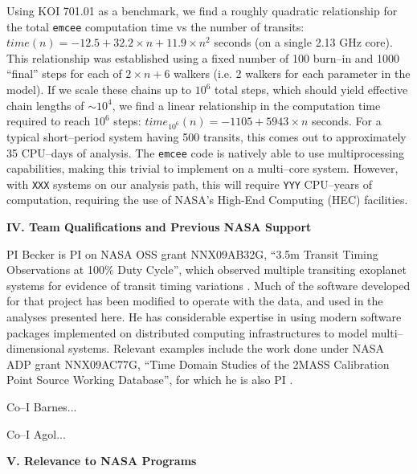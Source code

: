 Using KOI 701.01 as a benchmark, we find a roughly quadratic
relationship for the total {\tt emcee} computation time vs the number
of transits: $time(n) = -12.5 + 32.2 \times n + 11.9 \times n^2$
seconds (on a single 2.13 GHz core).  This relationship was
established using a fixed number of 100 burn--in and 1000 ``final''
steps for each of $2 \times n + 6$ walkers (i.e. 2 walkers for each
parameter in the model).  If we scale these chains up to $10^6$ total
steps, which should yield effective chain lengths of $\sim 10^4$, we
find a linear relationship in the computation time required to reach
$10^6$ steps: $time_{10^6}(n) = -1105 + 5943 \times n$ seconds.  For a
typical short--period system having 500 transits, this comes out to
approximately 35 CPU--days of analysis.  The {\tt emcee} code is
natively able to use multiprocessing capabilities, making this trivial
to implement on a multi--core system.  However, with {\tt XXX} systems
on our analysis path, this will require {\tt YYY} CPU--years of
computation, requiring the use of NASA's High-End Computing (HEC)
facilities.  

\bigskip
\centerline{\bf IV. Team Qualifications and Previous NASA Support}
\smallskip

PI Becker is PI on NASA OSS grant NNX09AB32G, ``3.5m Transit Timing
Observations at 100\% Duty Cycle'', which observed multiple transiting
exoplanet systems for evidence of transit timing variations
\citep{2011ApJ...731..123K, 2013ApJ...764....8K, 2013ApJ...764L..17B,
  2013arXiv1304.5713K}.  Much of the software developed for that
project has been modified to operate with the \kepler data, and used in
the analyses presented here.  He has considerable expertise in using
modern software packages implemented on distributed computing
infrastructures to model multi--dimensional systems.  Relevant
examples include the work done under NASA ADP grant NNX09AC77G, ``Time
Domain Studies of the 2MASS Calibration Point Source Working
Database'', for which he is also PI
\citep{2012ApJ...748...58D,2013ApJ...764...62D}.

Co--I Barnes...

Co--I Agol...

\bigskip
\centerline{\bf V. Relevance to NASA Programs}
\smallskip

